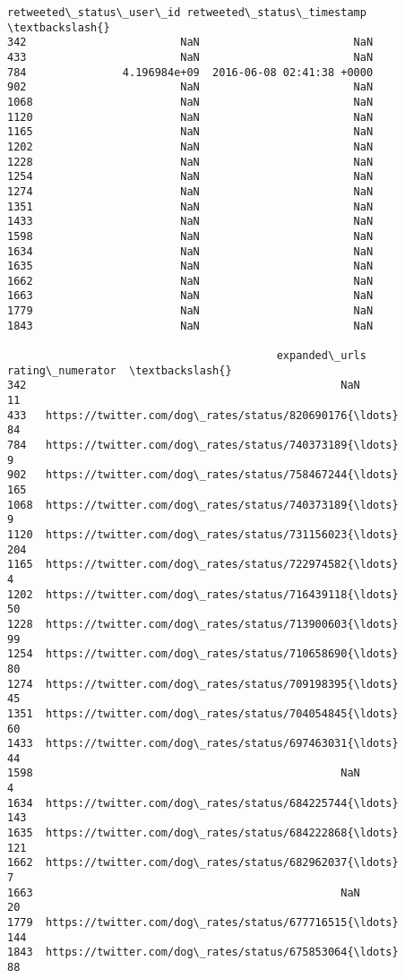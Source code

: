 \documentclass[11pt]{article}
\begin{document}
\begin{tcolorbox}[breakable, size=fbox, boxrule=.5pt, pad at break*=1mm, opacityfill=0]
\begin{Verbatim}[commandchars=\\\{\}]
      retweeted\_status\_user\_id retweeted\_status\_timestamp  \textbackslash{}
342                        NaN                        NaN
433                        NaN                        NaN
784               4.196984e+09  2016-06-08 02:41:38 +0000
902                        NaN                        NaN
1068                       NaN                        NaN
1120                       NaN                        NaN
1165                       NaN                        NaN
1202                       NaN                        NaN
1228                       NaN                        NaN
1254                       NaN                        NaN
1274                       NaN                        NaN
1351                       NaN                        NaN
1433                       NaN                        NaN
1598                       NaN                        NaN
1634                       NaN                        NaN
1635                       NaN                        NaN
1662                       NaN                        NaN
1663                       NaN                        NaN
1779                       NaN                        NaN
1843                       NaN                        NaN

                                          expanded\_urls  rating\_numerator  \textbackslash{}
342                                                 NaN                11
433   https://twitter.com/dog\_rates/status/820690176{\ldots}                84
784   https://twitter.com/dog\_rates/status/740373189{\ldots}                 9
902   https://twitter.com/dog\_rates/status/758467244{\ldots}               165
1068  https://twitter.com/dog\_rates/status/740373189{\ldots}                 9
1120  https://twitter.com/dog\_rates/status/731156023{\ldots}               204
1165  https://twitter.com/dog\_rates/status/722974582{\ldots}                 4
1202  https://twitter.com/dog\_rates/status/716439118{\ldots}                50
1228  https://twitter.com/dog\_rates/status/713900603{\ldots}                99
1254  https://twitter.com/dog\_rates/status/710658690{\ldots}                80
1274  https://twitter.com/dog\_rates/status/709198395{\ldots}                45
1351  https://twitter.com/dog\_rates/status/704054845{\ldots}                60
1433  https://twitter.com/dog\_rates/status/697463031{\ldots}                44
1598                                                NaN                 4
1634  https://twitter.com/dog\_rates/status/684225744{\ldots}               143
1635  https://twitter.com/dog\_rates/status/684222868{\ldots}               121
1662  https://twitter.com/dog\_rates/status/682962037{\ldots}                 7
1663                                                NaN                20
1779  https://twitter.com/dog\_rates/status/677716515{\ldots}               144
1843  https://twitter.com/dog\_rates/status/675853064{\ldots}                88


\end{Verbatim}
\end{tcolorbox}
\end{document}
